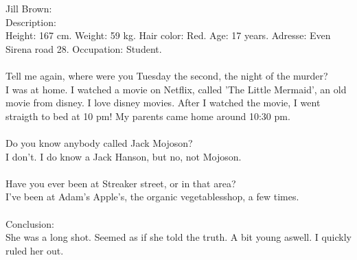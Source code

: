 \documentclass[]{article}
\begin{document}
Jill Brown: \\
Description: \\ Height: 167 cm. Weight: 59 kg. Hair color: Red. Age: 17 years. Adresse: Even Sirena road  28. Occupation: Student.
\\ \\
Tell me again, where were you Tuesday the second, the night of the murder? \\
I was at home. I watched a movie on Netflix, called 'The Little Mermaid', an old movie from disney. I love disney movies. After I watched the movie, I went straigth to bed at 10 pm! My parents came home around 10:30 pm. 
\\ \\
Do you know anybody called Jack Mojoson? \\
I don't. I do know a Jack Hanson, but no, not Mojoson.
\\ \\
Have you ever been at Streaker street, or in that area? \\
I've been at Adam's Apple's, the organic vegetablesshop, a few times. \\ \\
Conclusion: \\ She was a long shot. Seemed as if she told the truth. A bit young aswell. I quickly ruled her out.
\\ \\ 
\end{document}
